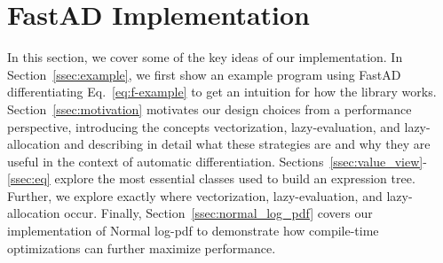 \section{FastAD Implementation}\label{sec:fastad}

In this section, we cover some of the key ideas of our implementation\footnotemark.
In Section~\ref{ssec:example}, we first show an example program using FastAD
differentiating Eq.~\ref{eq:f-example} to get an intuition for how the library works.
Section~\ref{ssec:motivation} motivates our design choices from a performance perspective, 
introducing the concepts vectorization, lazy-evaluation, and lazy-allocation and
describing in detail what these strategies are and
why they are useful in the context of automatic differentiation.
Sections~\ref{ssec:value_view}-\ref{ssec:eq} explore the most essential classes
used to build an expression tree.
Further, we explore exactly where vectorization, lazy-evaluation, and lazy-allocation occur.
Finally, Section~\ref{ssec:normal_log_pdf} covers our implementation of
Normal log-pdf to demonstrate how compile-time optimizations 
can further maximize performance.






















